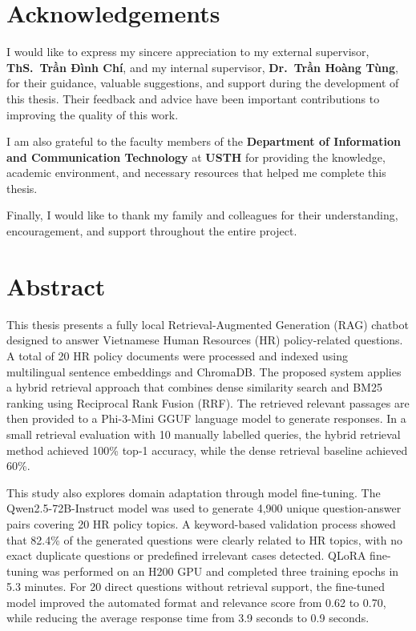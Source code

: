 \documentclass[12pt,a4paper,oneside]{report}
\begin{document}
\newpage
\chapter*{Acknowledgements}
I would like to express my sincere appreciation to my external supervisor,
\textbf{ThS.\ Trần Đình Chí}, and my internal supervisor, \textbf{Dr.\ Trần Hoàng Tùng},
for their guidance, valuable suggestions, and support during the development
of this thesis. Their feedback and advice have been important contributions
to improving the quality of this work.

I am also grateful to the faculty members of the \textbf{Department of
Information and Communication Technology} at \textbf{USTH} for providing the
knowledge, academic environment, and necessary resources that helped me
complete this thesis.

Finally, I would like to thank my family and colleagues for their understanding,
encouragement, and support throughout the entire project.

\newpage
\chapter*{Abstract}
This thesis presents a fully local Retrieval-Augmented Generation (RAG)
chatbot designed to answer Vietnamese Human Resources (HR) policy-related
questions. A total of 20 HR policy documents were processed and indexed using
multilingual sentence embeddings and ChromaDB. The proposed system applies a
hybrid retrieval approach that combines dense similarity search and BM25
ranking using Reciprocal Rank Fusion (RRF). The retrieved relevant passages
are then provided to a Phi-3-Mini GGUF language model to generate responses.
In a small retrieval evaluation with 10 manually labelled queries, the hybrid
retrieval method achieved 100\% top-1 accuracy, while the dense retrieval
baseline achieved 60\%.

This study also explores domain adaptation through model fine-tuning. The
Qwen2.5-72B-Instruct model was used to generate 4,900 unique question-answer
pairs covering 20 HR policy topics. A keyword-based validation process showed
that 82.4\% of the generated questions were clearly related to HR topics, with
no exact duplicate questions or predefined irrelevant cases detected. QLoRA
fine-tuning was performed on an H200 GPU and completed three training epochs
in 5.3 minutes. For 20 direct questions without retrieval support, the
fine-tuned model improved the automated format and relevance score from 0.62
to 0.70, while reducing the average response time from 3.9 seconds to 0.9
seconds.
\end{document}
